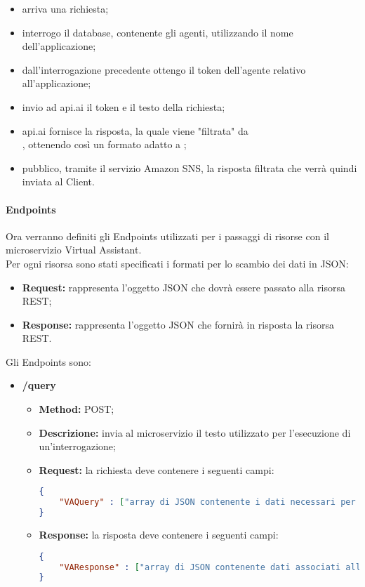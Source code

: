 \begin{itemize}
	\item arriva una richiesta;
	\item interrogo il database, contenente gli agenti, utilizzando il nome dell'applicazione;
	\item dall'interrogazione precedente ottengo il token dell'agente relativo all'applicazione;
	\item invio ad api.ai il token e il testo della richiesta;
	\item api.ai fornisce la risposta, la quale viene "filtrata" da\\ , ottenendo così un formato adatto a ;
	\item pubblico, tramite il servizio Amazon SNS, la risposta filtrata che verrà quindi inviata al Client.
\end{itemize}
\paragraph{Endpoints}

Ora verranno definiti gli Endpoints utilizzati per i passaggi di risorse con il microservizio Virtual Assistant.\\
Per ogni risorsa sono stati specificati i formati per lo scambio dei dati in JSON: 
\begin{itemize}
\item \textbf{Request:} rappresenta l’oggetto JSON che dovrà essere passato alla risorsa REST;
\item \textbf{Response:} rappresenta l’oggetto JSON che fornirà in risposta la risorsa REST.
\end{itemize}
Gli Endpoints sono: 
\begin{itemize}
\item \textbf{/query}\\
\begin{itemize}
\item \textbf{Method:} POST;
\item \textbf{Descrizione:} invia al microservizio il testo utilizzato per l'esecuzione di un'interrogazione;
\item \textbf{Request:} la richiesta deve contenere i seguenti campi:
\begin{lstlisting}[language=json,firstnumber=1]
{
	"VAQuery" : ["array di JSON contenente i dati necessari per l'interrogazione"]
}
\end{lstlisting}
\item \textbf{Response:} la risposta deve contenere i seguenti campi:
\begin{lstlisting}[language=json,firstnumber=1]
{
	"VAResponse" : ["array di JSON contenente dati associati alla risposta di Virtual Assistant"]
}
\end{lstlisting}
\end{itemize}
\end{itemize}


